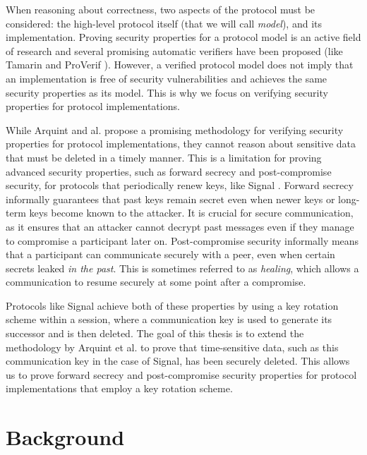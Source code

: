 \documentclass{article}
\begin{document}
When reasoning about correctness, two aspects of the protocol must be considered: the high-level protocol itself (that we will call \emph{model}), and its implementation. Proving security properties for a protocol model is an active field of research and several promising automatic verifiers have been proposed (like Tamarin \cite{meier2013tamarin} and ProVerif \cite{blanchet2016modeling}). However, a verified protocol model does not imply that an implementation is free of security vulnerabilities and achieves the same security properties as its model. This is why we focus on verifying security properties for protocol implementations.

While Arquint and al.\cite{arquint2022generic} propose a promising methodology for verifying security properties for protocol implementations, they cannot reason about sensitive data that must be deleted in a timely manner.
This is a limitation for proving advanced security properties, such as forward secrecy and post-compromise security, for protocols that periodically renew keys, like Signal \cite{marlinspike2016x3dh}.
Forward secrecy informally guarantees that past keys remain secret even when newer keys or long-term keys become known to the attacker.
It is crucial for secure communication, as it ensures that an attacker cannot decrypt past messages even if they manage to compromise a participant later on.
Post-compromise security informally means that a participant can communicate securely with a peer, even when certain secrets leaked \emph{in the past}.
This is sometimes referred to as \emph{healing}, which allows a communication to resume securely at some point after a compromise.

Protocols like Signal achieve both of these properties by using a key rotation scheme within a session, where a communication key is used to generate its successor and is then deleted. The goal of this thesis is to extend the methodology by Arquint et al. to prove that time-sensitive data, such as this communication key in the case of Signal, has been securely deleted. This allows us to prove forward secrecy and post-compromise security properties for protocol implementations that employ a key rotation scheme.

\section{Background}
\end{document}
